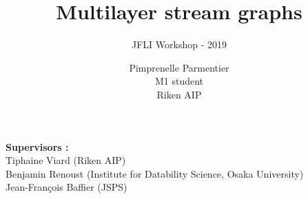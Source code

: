 \documentclass[15pt]{beamer}
\title{Multilayer stream graphs} %
\subtitle{JFLI Workshop - 2019}
\author{Pimprenelle Parmentier \\ M1 student\\ Riken AIP} %
\institute{\textit{pimprenelle.parmentier@polytechnique.edu}}
\date{}
\begin{document}
\begin{frame}%
\titlepage %
\centering
\textbf{Supervisors :} \\
Tiphaine Viard {\footnotesize(Riken AIP)}\\
Benjamin Renoust {\scriptsize(Institute for Datability Science}, {\footnotesize Osaka University)}\\
Jean-François Baffier {\footnotesize(JSPS)}
\end{frame}

\end{document}
